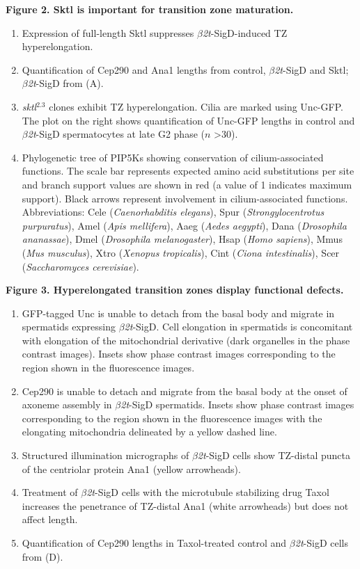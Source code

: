 \documentclass[12pt, twoside, letterpaper]{article}
\newcommand{\sigd}{$\beta$\textit{2t}-SigD}
\begin{document}
\begin{doublespacing}
\begin{linenumbers}
    \textbf{Figure 2. Sktl is important for transition zone maturation.}
    \begin{enumerate}[label={(\Alph*)}, nolistsep]
    \item Expression of full-length Sktl suppresses \sigd{}-induced TZ hyperelongation.
    \item Quantification of Cep290 and Ana1 lengths from control, \sigd{} and Sktl; \sigd{} from (A).
    \item \textit{sktl}$^{2.3}$ clones exhibit TZ hyperelongation. Cilia are marked using
      Unc-GFP. The plot on the right shows quantification of Unc-GFP lengths in control and \sigd{}
      spermatocytes at late G2 phase ($n$ >30).
    \item Phylogenetic tree of PIP5Ks showing conservation of cilium-associated functions.
      The scale bar represents expected amino acid substitutions per site and branch support values are shown in red (a value of 1 indicates maximum support).
      Black arrows represent involvement in cilium-associated functions.
      Abbreviations: Cele (\textit{Caenorhabditis elegans}), Spur (\textit{Strongylocentrotus purpuratus}), Amel (\textit{Apis mellifera}), Aaeg (\textit{Aedes aegypti}), Dana (\textit{Drosophila ananassae}), Dmel (\textit{Drosophila melanogaster}), Hsap (\textit{Homo sapiens}), Mmus (\textit{Mus musculus}), Xtro (\textit{Xenopus tropicalis}), Cint (\textit{Ciona intestinalis}), Scer (\textit{Saccharomyces cerevisiae}).
    \end{enumerate}
    
    \textbf{Figure 3. Hyperelongated transition zones display functional defects.}
    \begin{enumerate}[label={(\Alph*)}, nolistsep]
    \item GFP-tagged Unc is unable to detach from the basal body and migrate in spermatids expressing \sigd{}.
      Cell elongation in spermatids is concomitant with elongation of the mitochondrial derivative (dark organelles in the phase contrast images).
      Insets show phase contrast images corresponding to the region shown in the fluorescence images.
    \item Cep290 is unable to detach and migrate from the basal body at the onset of axoneme assembly in \sigd{} spermatids.
      Insets show phase contrast images corresponding to the region shown in the fluorescence images with the
      elongating mitochondria delineated by a yellow dashed line.
    \item Structured illumination micrographs of \sigd{} cells show TZ-distal puncta of the centriolar protein Ana1 (yellow arrowheads).
    \item Treatment of \sigd{} cells with the microtubule stabilizing drug Taxol increases the penetrance of TZ-distal Ana1 (white arrowheads)
      but does not affect length.
    \item Quantification of Cep290 lengths in Taxol-treated control and \sigd{} cells from (D).
    \end{enumerate}


\end{linenumbers}
\end{doublespacing}
\end{document}
